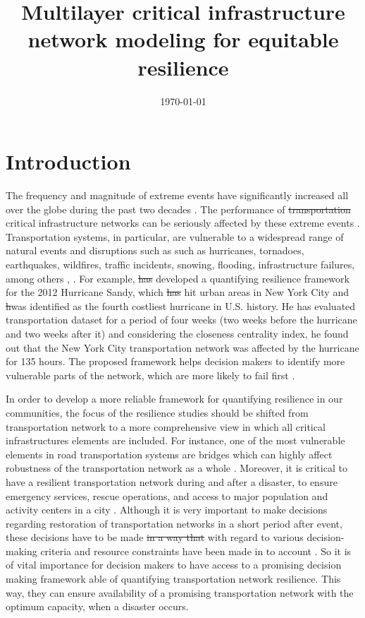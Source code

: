 \documentclass[11pt,twoside]{article}
\numberwithin{equation}{section}
\newcommand{\?}{\stackrel{?}{=}}
\begin{document}
\title{Multilayer critical infrastructure network modeling for equitable resilience}

\author{}
\date{\today}
\maketitle



\section{Introduction}
The frequency and magnitude of extreme events have signiﬁcantly increased all over the globe during the past two decades
\citep{kermanshah2017robustness}. The performance of \st{transportation} critical infrastructure networks can be
seriously affected by these extreme events \citep{ilbeigi2019statistical}.  Transportation systems, in particular, are vulnerable to a widespread range
of natural events and disruptions such as such as hurricanes, tornadoes, earthquakes, wildfires, traffic incidents,
snowing, flooding, infrastructure failures, among others \citep{bhavathrathan2018algorithm},
\citep{twumasi-boakye2018resilience}.  For example, \citet{ilbeigi2019statistical} \st{has} developed a quantifying
resilience framework for the 2012 Hurricane Sandy, which \st{has} hit urban areas in New York City and \st{h}was
identified as the fourth costliest hurricane in U.S. history.  He has evaluated transportation dataset for a period of
four weeks (two weeks before the hurricane and two weeks after it) and considering the closeness centrality index, he
found out that the New York City transportation network was affected by the hurricane for 135 hours. The proposed
framework helps decision makers to identify more vulnerable parts of the network, which are more likely to fail first
\citep{ilbeigi2019statistical}.  
  
In order to develop a more reliable framework for quantifying resilience in our communities, the focus of the
resilience studies should be shifted from transportation network to a more comprehensive view in which all critical
infrastructures elements are included. For instance, one of the most vulnerable elements in road transportation systems
are bridges which can highly affect robustness of the transportation network as a whole
\citep{zhang2017resiliencebased}.  Moreover, 
it is critical to have a resilient transportation network during and after a disaster, to ensure emergency services,
rescue operations, and access to major population and activity centers in a city \citep{ilbeigi2019statistical}.
Although it is very important to make decisions regarding restoration of transportation networks in a short period after
event, these decisions have to be made \st{in a way that} with regard to various decision-making criteria and resource
constraints have been made in to account \citep{liu2020optimal}.  So it is of vital importance for decision makers to
have access to a promising decision making framework able of quantifying transportation network resilience. This way,
they can ensure availability of a promising transportation network with the optimum capacity, when a disaster occurs.
\end{document}
